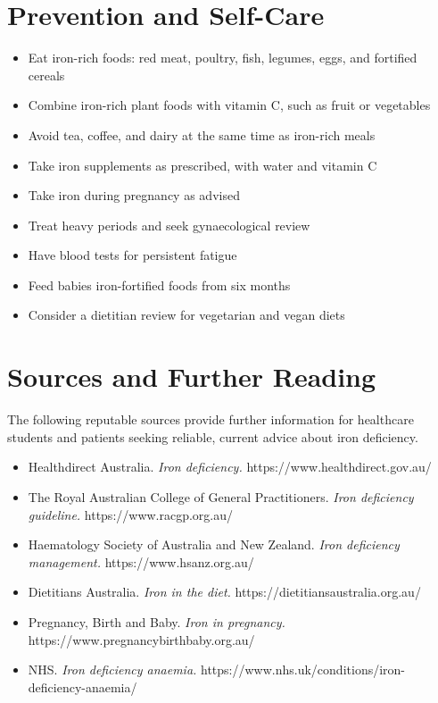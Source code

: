 \section*{Prevention and Self-Care}
\begin{itemize}
    \item Eat iron-rich foods: red meat, poultry, fish, legumes, eggs, and fortified cereals
    \item Combine iron-rich plant foods with vitamin C, such as fruit or vegetables
    \item Avoid tea, coffee, and dairy at the same time as iron-rich meals
    \item Take iron supplements as prescribed, with water and vitamin C
    \item Take iron during pregnancy as advised
    \item Treat heavy periods and seek gynaecological review
    \item Have blood tests for persistent fatigue
    \item Feed babies iron-fortified foods from six months
    \item Consider a dietitian review for vegetarian and vegan diets
\end{itemize}

\section*{Sources and Further Reading}
The following reputable sources provide further information for healthcare students and patients seeking reliable, current advice about iron deficiency.
\begin{itemize}
    \item Healthdirect Australia. \textit{Iron deficiency.} https://www.healthdirect.gov.au/
    \item The Royal Australian College of General Practitioners. \textit{Iron deficiency guideline.} https://www.racgp.org.au/
    \item Haematology Society of Australia and New Zealand. \textit{Iron deficiency management.} https://www.hsanz.org.au/
    \item Dietitians Australia. \textit{Iron in the diet.} https://dietitiansaustralia.org.au/
    \item Pregnancy, Birth and Baby. \textit{Iron in pregnancy.} https://www.pregnancybirthbaby.org.au/
    \item NHS. \textit{Iron deficiency anaemia.} https://www.nhs.uk/conditions/iron-deficiency-anaemia/
\end{itemize}
